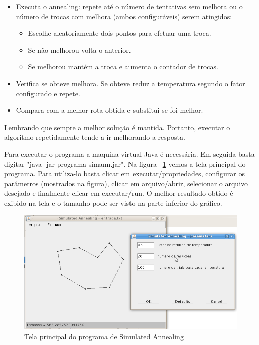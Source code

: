 \documentclass{acm_proc_article-sp}
\begin{document}
\begin{itemize}
	\item Executa o annealing: repete até o número de tentativas sem melhora ou o número de trocas com melhora (ambos configuráveis) serem atingidos:
		\begin{itemize}
			\item Escolhe aleatoriamente dois pontos para efetuar uma troca.
			\item Se não melhorou volta o anterior.
			\item Se melhorou mantém a troca e aumenta o contador de trocas.
		\end{itemize}
	\item Verifica se obteve melhora. Se obteve reduz a temperatura segundo o fator configurado e repete.
	\item Compara com a melhor rota obtida e substitui se foi melhor.
\end{itemize} 

Lembrando que sempre a melhor solução é mantida. Portanto, executar o algoritmo repetidamente tende a ir melhorando a resposta.

Para executar o programa a maquina virtual Java é necessária. Em seguida basta digitar "java -jar programa-simann.jar". Na figura ~\ref{fig:telaSimAn} vemos a tela principal do programa. Para utiliza-lo basta clicar em executar/propriedades, configurar os parâmetros (mostrados na figura), clicar em arquivo/abrir, selecionar o arquivo desejado e finalmente clicar em executar/run. O melhor resultado obtido é exibido na tela e o tamanho pode ser visto na parte inferior do gráfico.

\begin{figure}[ht]
 \begin{center}
  \includegraphics[scale=0.3]{imagens/siman_TSP.png} 
  \caption{Tela principal do programa de Simulated Annealing}
  \label{fig:telaSimAn}
 \end{center}
\end{figure}
\end{document}
